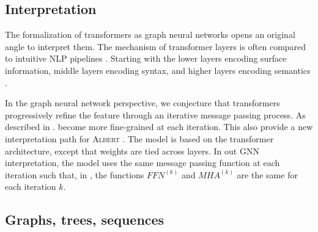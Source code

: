 





\subsection{Interpretation}

The formalization of transformers as graph neural networks opens an original angle to interpret them.
The mechanism of transformer layers is often compared to intuitive NLP pipelines \parencite{tenney_19}. 
Starting with the lower layers encoding surface information, middle layers encoding syntax, and higher layers encoding semantics \parencite{jawahar_19, peters_18}.

In the graph neural network perspective, we conjecture that transformers progressively refine the feature through an iterative message passing process.
As described in \textcite{xin_20}.  become more fine-grained at each iteration.
This also provide a new interpretation path for \textsc{Albert} \parencite{lan_20}.
The model is based on the transformer architecture, except that weights are tied across layers.
In out GNN interpretation, the model uses the same message passing function at each iteration such that, in , the functions $FFN^{(k)}$ and $MHA^{(k)}$ are the same for each iteration $k$.

\subsection{Graphs, trees, sequences}

